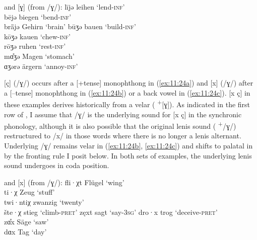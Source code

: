 \ea%
\label{ex:11:23}\relax[ʝ] and [ɣ] (from /ɣ/):
\ea\label{ex:11:23a} lījə \tab [liːʝə] \tab leihen \tab ‘lend-\textsc{inf}’ \\
    bējə \tab [beːʝə] \tab biegen \tab ‘bend-\textsc{inf}’ \\
    brǟjə \tab [bræːʝə] \tab Gehirn \tab ‘brain’ 
\ex\label{ex:11:23b} būʒə \tab [buːɣə] \tab bauen \tab ‘build-\textsc{inf}’ \\
    kōʒə \tab [koːɣə] \tab kauen \tab ‘chew-\textsc{inf}’ \\
    rōʒə \tab [roːɣə] \tab ruhen \tab ‘rest-\textsc{inf}’ \\
    mɑ̊ʒə \tab [zaːɣə] \tab Magen \tab ‘stomach’ \\
    ɑʒərə \tab [ɑːɣərə] \tab ärgern \tab ‘annoy-\textsc{inf}’ 
\z 
\z 

[ç] (/ɣ/) occurs after a [+tense] monophthong in (\ref{ex:11:24a}) and [x] (/ɣ/) after a [--tense] monophthong in (\ref{ex:11:24b}) or a back vowel in (\ref{ex:11:24c}). [x ç] in these examples derives historically from a velar ( \textsuperscript{+}[ɣ]). As indicated in the first row of , I assume that /ɣ/ is the underlying sound for [x ç] in the synchronic phonology, although it is also possible that the original lenis sound ( \textsuperscript{+}/ɣ/) restructured to /x/ in those words where there is no longer a lenis alternant. Underlying /ɣ/ remains velar in (\ref{ex:11:24b}, \ref{ex:11:24c}) and shifts to palatal in  by the fronting rule I posit below. In both sets of examples, the underlying lenis sound undergoes  in coda position.\largerpage[2]

\ea%
\label{ex:11:24}\relax[ç] and [x] (from /ɣ/):
\ea\label{ex:11:24a} fli·χt \tab  [fli·çt] \tab Flügel \tab ‘wing’ \\
    ti·χ \tab [ti·ç] \tab Zeug \tab ‘stuff’ \\
    twi·ntiχ \tab [twintiç] \tab zwanzig \tab ‘twenty’ \\
    šte·χ \tab [ʃte·ç] \tab stieg \tab ‘climb-\textsc{pret}’ 
\ex\label{ex:11:24b} zęxt \tab [zɛxt] \tab sagt \tab ‘say-\textsc{3sg}’ 
\ex\label{ex:11:24c} dro·x \tab  [dro·x] \tab trog \tab ‘deceive-\textsc{pret}’ \\
    zɑ̊x \tab [zaːx] \tab Säge \tab ‘saw’ \\
    dɑx \tab [dɑx] \tab Tag \tab ‘day’ 
\z 
\z 

